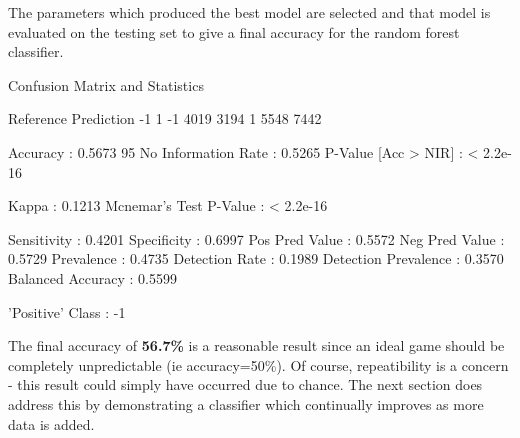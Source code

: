 \documentclass[10pt]{article}
\begin{document}
The parameters which produced the best model are selected and that model is evaluated on the testing set to give a final accuracy for the random forest classifier.
\hspace{1cm} 
\begin{Schunk}
\begin{Soutput}

Confusion Matrix and Statistics

          Reference
Prediction   -1    1
        -1 4019 3194
        1  5548 7442
                                          
               Accuracy : 0.5673          
                 95%
    No Information Rate : 0.5265          
    P-Value [Acc > NIR] : < 2.2e-16       
                                          
                  Kappa : 0.1213          
 Mcnemar's Test P-Value : < 2.2e-16       
                                          
            Sensitivity : 0.4201          
            Specificity : 0.6997          
         Pos Pred Value : 0.5572          
         Neg Pred Value : 0.5729          
             Prevalence : 0.4735          
         Detection Rate : 0.1989          
   Detection Prevalence : 0.3570          
      Balanced Accuracy : 0.5599          
                                          
       'Positive' Class : -1              
\end{Soutput}
\end{Schunk}
\hspace{1cm} 

The final accuracy of \textbf{56.7\%} is a reasonable result since an ideal game should be completely unpredictable (ie accuracy=50\%). Of course, repeatibility is a concern - this result could simply have occurred due to chance. The next section does address this by demonstrating a classifier which continually improves as more data is added.\\
\end{document}
